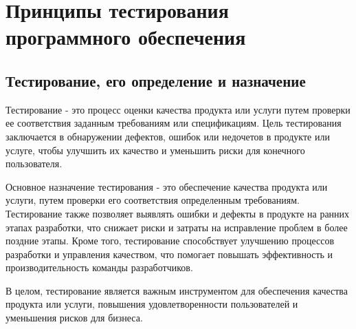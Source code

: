 \newpage%
\chapter{Принципы тестирования программного обеспечения}
\section{Тестирование, его определение и назначение}
Тестирование - это процесс оценки качества продукта или услуги путем проверки ее соответствия заданным требованиям или спецификациям. Цель тестирования заключается в обнаружении дефектов, ошибок или недочетов в продукте или услуге, чтобы улучшить их качество и уменьшить риски для конечного пользователя.

Основное назначение тестирования - это обеспечение качества продукта или услуги, путем проверки его соответствия определенным требованиям. Тестирование также позволяет выявлять ошибки и дефекты в продукте на ранних этапах разработки, что снижает риски и затраты на исправление проблем в более поздние этапы. Кроме того, тестирование способствует улучшению процессов разработки и управления качеством, что помогает повышать эффективность и производительность команды разработчиков.

В целом, тестирование является важным инструментом для обеспечения качества продукта или услуги, повышения удовлетворенности пользователей и уменьшения рисков для бизнеса.
